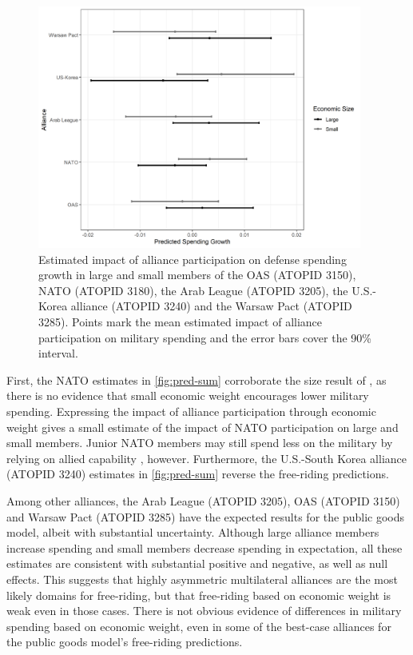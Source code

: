 \documentclass[12pt]{article}
\begin{document}
\begin{figure}[htbp]
	\centering
		\includegraphics[width=0.95\textwidth]{pred-sum.png}
	\caption{Estimated impact of alliance participation on defense spending growth in large and small members of the OAS (ATOPID 3150), NATO (ATOPID 3180), the Arab League (ATOPID 3205), the U.S.-Korea alliance (ATOPID 3240) and the Warsaw Pact (ATOPID 3285). Points mark the mean estimated impact of alliance participation on military spending and the error bars cover the 90\% interval.}
	\label{fig:pred-sum}
\end{figure}


First, the NATO estimates in \autoref{fig:pred-sum} corroborate the size result of \citet{PluemperNeumayer2015}, as there is no evidence that small economic weight encourages lower military spending.
Expressing the impact of alliance participation through economic weight gives a small estimate of the impact of NATO participation on large and small members.  
Junior NATO members may still spend less on the military by relying on allied capability \citep{GeorgeSandler2017}, however. 
Furthermore, the U.S.-South Korea alliance (ATOPID 3240) estimates in \autoref{fig:pred-sum} reverse the free-riding predictions. 


Among other alliances, the Arab League (ATOPID 3205), OAS (ATOPID 3150) and Warsaw Pact (ATOPID 3285) have the expected results for the public goods model, albeit with substantial uncertainty.
Although large alliance members increase spending and small members decrease spending in expectation, all these estimates are consistent with substantial positive and negative, as well as null effects. 
This suggests that highly asymmetric multilateral alliances are the most likely domains for free-riding, but that free-riding based on economic weight is weak even in those cases.
There is not obvious evidence of differences in military spending based on economic weight, even in some of the best-case alliances for the public goods model's free-riding predictions. 
\end{document}
